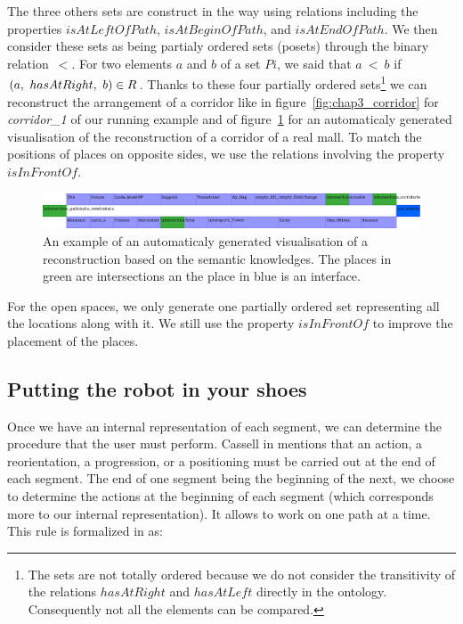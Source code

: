 The three others sets are construct in the way using relations including the properties $isAtLeftOfPath$, $isAtBeginOfPath$, and $isAtEndOfPath$. We then consider these sets as being partialy ordered sets (posets) through the binary relation~$<$. For two elements $a$ and $b$ of a set $Pi$, we said that $a\ <\ b$ if $(a,\ hasAtRight,\ b) \in R$. Thanks to these four partially ordered sets\footnote{The sets are not totally ordered because we do not consider the transitivity of the relations $hasAtRight$ and $hasAtLeft$ directly in the ontology. Consequently not all the elements can be compared.} we can reconstruct the arrangement of a corridor like in figure~\ref{fig:chap3_corridor} for \textit{corridor\_1} of our running example and of figure~\ref{fig:chap3_pallokatu} for an automaticaly generated visualisation of the reconstruction of a corridor of a real mall. To match the positions of places on opposite sides, we use the relations involving the property $isInFrontOf$.

\begin{figure}[ht!]
\centering
\includegraphics[width=\textwidth]{figures/chapter3/pallokatu.png}
\caption{\label{fig:chap3_pallokatu} An example of an automaticaly generated visualisation of a reconstruction based on the semantic knowledges. The places in green are intersections an the place in blue is an interface. }
\end{figure}

For the open spaces, we only generate one partially ordered set representing all the locations along with it. We still use the property $isInFrontOf$ to improve the placement of the places.

\subsection{Putting the robot in your shoes}

Once we have an internal representation of each segment, we can determine the procedure that the user must perform. Cassell in \cite{cassell_2007_trading} mentions that an action, a reorientation, a progression, or a positioning must be carried out at the end of each segment. The end of one segment being the beginning of the next, we choose to determine the actions at the beginning of each segment (which corresponds more to our internal representation). It allows to work on one path at a time. This rule is formalized in \cite{mallot_2009_embodied} as:

